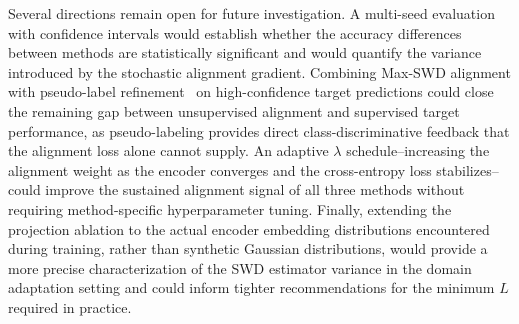 \documentclass{article}
\begin{document}
	Several directions remain open for future investigation. A multi-seed evaluation with confidence intervals would establish whether the accuracy differences between methods are statistically significant and would quantify the variance introduced by the stochastic alignment gradient. Combining Max-SWD alignment with pseudo-label refinement~\citep{lee} on high-confidence target predictions could close the remaining gap between unsupervised alignment and supervised target performance, as pseudo-labeling provides direct class-discriminative feedback that the alignment loss alone cannot supply. An adaptive $\lambda$ schedule--increasing the alignment weight as the encoder converges and the cross-entropy loss stabilizes--could improve the sustained alignment signal of all three methods without requiring method-specific hyperparameter tuning. Finally, extending the projection ablation to the actual encoder embedding distributions encountered during training, rather than synthetic Gaussian distributions, would provide a more precise characterization of the SWD estimator variance in the domain adaptation setting and could inform tighter recommendations for the minimum $L$ required in practice.
	
	
	
	\newpage
	
	
	
	
\end{document}
